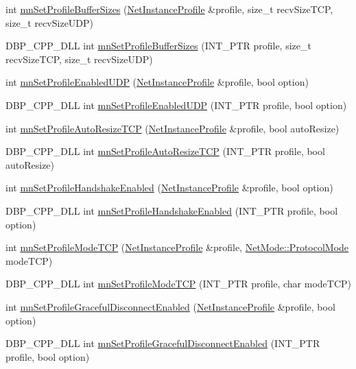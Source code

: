 \begin{DoxyCompactItemize}
\item 
int \hyperlink{group__proc_commands_ga049fcd0a4c7b6d23781826ea33fb1991}{mnSetProfileBufferSizes} (\hyperlink{class_net_instance_profile}{NetInstanceProfile} \&profile, size\_\-t recvSizeTCP, size\_\-t recvSizeUDP)
\item 
DBP\_\-CPP\_\-DLL int \hyperlink{group__proc_commands_ga2a3156ef14550e2502871e07b4d14e71}{mnSetProfileBufferSizes} (INT\_\-PTR profile, size\_\-t recvSizeTCP, size\_\-t recvSizeUDP)
\item 
int \hyperlink{group__proc_commands_ga5944d44f314464cd2e54ef97932624be}{mnSetProfileEnabledUDP} (\hyperlink{class_net_instance_profile}{NetInstanceProfile} \&profile, bool option)
\item 
DBP\_\-CPP\_\-DLL int \hyperlink{group__proc_commands_ga9b57aa13886f8cbad981efcbd6eda55b}{mnSetProfileEnabledUDP} (INT\_\-PTR profile, bool option)
\item 
int \hyperlink{group__proc_commands_ga601f764dc3721b9376807b7338bd57e1}{mnSetProfileAutoResizeTCP} (\hyperlink{class_net_instance_profile}{NetInstanceProfile} \&profile, bool autoResize)
\item 
DBP\_\-CPP\_\-DLL int \hyperlink{group__proc_commands_ga1c1ad889fc6103f364518e98b91ecdb5}{mnSetProfileAutoResizeTCP} (INT\_\-PTR profile, bool autoResize)
\item 
int \hyperlink{group__proc_commands_ga7f704dde6483eb4e5b4bb3958c98bbb9}{mnSetProfileHandshakeEnabled} (\hyperlink{class_net_instance_profile}{NetInstanceProfile} \&profile, bool option)
\item 
DBP\_\-CPP\_\-DLL int \hyperlink{group__proc_commands_ga1b4d8ac7fc6d22f92339dc05b7c2c06f}{mnSetProfileHandshakeEnabled} (INT\_\-PTR profile, bool option)
\item 
int \hyperlink{group__proc_commands_gaecf77c1c7906ced1ff86a6c94ced1da7}{mnSetProfileModeTCP} (\hyperlink{class_net_instance_profile}{NetInstanceProfile} \&profile, \hyperlink{class_net_mode_a43cfa55ee6a4db66a8d7d6c27f766964}{NetMode::ProtocolMode} modeTCP)
\item 
DBP\_\-CPP\_\-DLL int \hyperlink{group__proc_commands_ga08110043448e44ec4e4522abbb909b5a}{mnSetProfileModeTCP} (INT\_\-PTR profile, char modeTCP)
\item 
int \hyperlink{group__proc_commands_gaa318fd49d83a6a4b37e11808424331cf}{mnSetProfileGracefulDisconnectEnabled} (\hyperlink{class_net_instance_profile}{NetInstanceProfile} \&profile, bool option)
\item 
DBP\_\-CPP\_\-DLL int \hyperlink{group__proc_commands_ga857500d66217e3c1c8261c2a372ca8b6}{mnSetProfileGracefulDisconnectEnabled} (INT\_\-PTR profile, bool option)

\end{DoxyCompactItemize}
